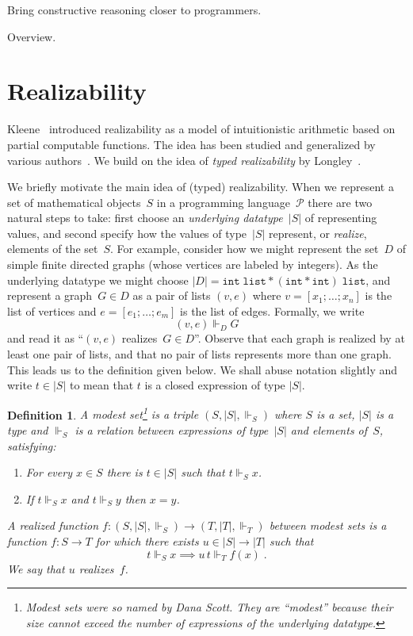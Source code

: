 \documentclass{article}
\newcommand{\ut}[1]{|#1|}
\newcommand{\PL}{\mathcal{P}}
\newcommand{\rz}{\Vdash}
\newtheorem{definition}[theorem]{Definition}
\begin{document}
Bring constructive reasoning closer to programmers.

Overview.

\section{Realizability}
\label{sec:realizability}

Kleene~\cite{KleeneSC:intint} introduced realizability as a model of
intuitionistic arithmetic based on partial computable functions. The
idea has been studied and generalized by various
authors~\cite{TroelstraA:rea,HylandJ:efft,HylandJ:trit,OostenJ:exer}.
We build on the idea of \emph{typed realizability} by
Longley~\cite{Longley00}.

We briefly motivate the main idea of (typed) realizability. When we
represent a set of mathematical objects~$S$ in a programming
language~$\PL$ there are two natural steps to take: first choose an
\emph{underlying datatype~$\ut{S}$} of representing values, and second
specify how the values of type~$\ut{S}$ represent, or \emph{realize},
elements of the set~$S$. For example, consider how we might represent
the set~$D$ of simple finite directed graphs (whose vertices are
labeled by integers). As the underlying datatype we might choose
$\ut{D} = \mathtt{int} \; \mathtt{list} * (\mathtt{int} *
\mathtt{int}) \; \mathtt{list}$, and represent a graph~$G \in D$ as a
pair of lists $(v,e)$ where $v = [x_1; \ldots; x_n]$ is the list of
vertices and $e = [e_1; \ldots; e_m]$ is the list of edges. Formally,
we write
%
\begin{equation*}
  (v, e) \rz_D G
\end{equation*}
%
and read it as ``$(v,e)$ realizes~$G \in D$''. Observe that each graph
is realized by at least one pair of lists, and that no pair of lists
represents more than one graph. This leads us to the definition given
below. We shall abuse notation slightly and write $t \in \ut{S}$ to
mean that $t$ is a closed expression of type $\ut{S}$.

\begin{definition}
  A \emph{modest set}\footnote{Modest sets were so named by Dana
    Scott. They are ``modest'' because their size cannot exceed the
    number of expressions of the underlying datatype.} is a triple
  $(S, \ut{S}, {\rz_S})$ where $S$ is a set, $\ut{S}$ is a type and
  $\rz_S$ is a relation between expressions of type~$\ut{S}$ and
  elements of~$S$, satisfying:
  \begin{enumerate}
  \item For every $x \in S$ there is $t \in \ut{S}$ such that $t \rz_S
    x$.
  \item If $t \rz_S x$ and $t \rz_S y$ then $x = y$.
  \end{enumerate}
  A \emph{realized function} $f : (S, \ut{S}, {\rz_S}) \to (T, \ut{T},
  {\rz_T})$ between modest sets is a function $f : S \to T$ for which
  there exists $u \in \ut{S} \to \ut{T}$ such that
  \begin{equation*}
    t \rz_S x \implies u\,t \rz_T f(x) \;.
  \end{equation*}
  We say that $u$ \emph{realizes}~$f$.
\end{definition}
\end{document}
